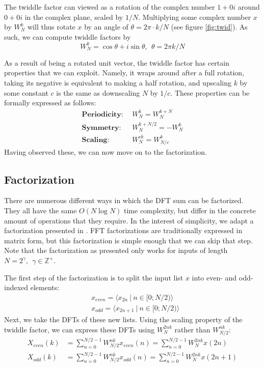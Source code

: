 The twiddle factor can viewed as a rotation of the complex number $1 + 0i$
around $0 + 0i$ in the complex plane, scaled by $1/N$.
Multiplying some complex number $x$ by $W_N^k$
will thus rotate $x$ by an angle of $\theta = 2 \pi \cdot k/N$ (see figure \ref{fig:twid}).
As such, we can compute twiddle factors by
\begin{equation}
    W_N^k = \cos \theta + i \sin \theta,~~\theta = 2\pi k/N
\end{equation}

As a result of being a rotated unit vector,
the twiddle factor has certain properties that we can exploit.
Namely, it wraps around after a full rotation,
taking its negative is equivalent to making a half rotation,
and upscaling $k$ by some constant $c$ is the same as downscaling $N$ by $1/c$.
These properties can be formally expressed as follows:
\begin{align}
    \textbf{Periodicity:} &~~W^k_N = W^{k + N}_N\\
    \textbf{Symmetry:}    &~~W^{k + N/2}_N = -W^k_N\\
    \textbf{Scaling:}     &~~W_N^{ck} = W_{N/c}^{k}
\end{align}
Having observed these, we can now move on to the factorization.

\subsection{Factorization}
There are numerous different ways in which the DFT sum can be factorized.
They all have the same $O(N \log N)$ time complexity,
but differ in the concrete amount of operations that they require.
In the interest of simplicity,
we adapt a factorization presented in \cite{brunton}.
FFT factorizations are traditionally expressed in matrix form,
but this factorization is simple enough that we can skip that step.
Note that the factorization as presented only works for inputs of length
$N = 2^\gamma,~~\gamma \in \mathbb{Z}^+$.

The first step of the factorization
is to split the input list $x$ into even- and odd-indexed elements:
\begin{align}
    &x_\textit{even} = \langle x_{2n} ~|~ n \in [0; N/2) \rangle\\
    &x_\textit{odd}  = \langle x_{2n + 1} ~|~ n \in [0; N/2) \rangle
\end{align}
%
Next, we take the DFTs of these new lists.
Using the scaling property of the twiddle factor,
we can express these DFTs using $W_N^{2nk}$ rather than $W_{N/2}^{nk}$:
\begin{align}
    X_\textit{even}(k) &= \sum_{n = 0}^{N/2 - 1} W_{N/2}^{nk} x_\textit{even}(n) = \sum_{n = 0}^{N/2 - 1} W_{N}^{2nk} x(2n) \\
    X_\textit{odd}(k) &= \sum_{n = 0}^{N/2 - 1} W_{N/2}^{nk} x_\textit{odd}(n) = \sum_{n = 0}^{N/2 - 1} W_{N}^{2nk} x(2n + 1)
\end{align}

